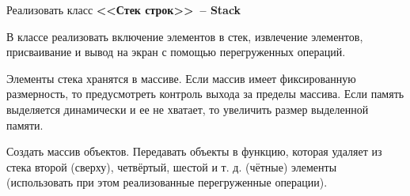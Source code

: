 Реализовать класс \textbf{<<Стек строк>>~-- Stack}


В классе реализовать включение элементов в стек, извлечение
элементов, присваивание и вывод на экран с помощью перегруженных операций.

Элементы стека хранятся в массиве. Если массив имеет фиксированную размерность, то
предусмотреть контроль выхода за пределы массива. Если память выделяется
динамически и ее не хватает, то увеличить размер выделенной памяти.

Создать массив
объектов. Передавать объекты в функцию, которая удаляет из стека второй (сверху),
четвёртый, шестой и т. д. (чётные) элементы (использовать при этом реализованные
перегруженные операции).
